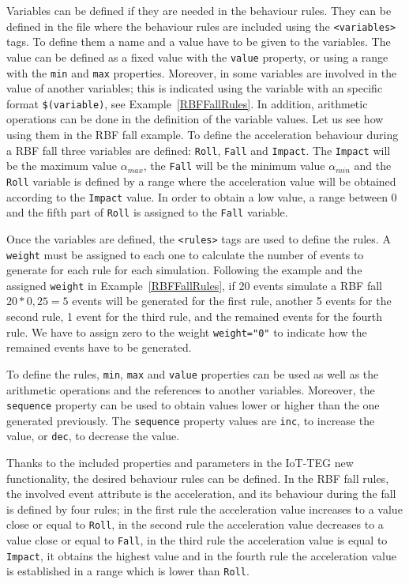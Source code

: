 \documentclass[review]{elsarticle}
\begin{document}
Variables can be defined if they are needed in the behaviour rules. They can be defined in the file where
the behaviour rules are included using the \texttt{<variables>} tags. To define them a name and a value 
have to be given to the variables. The value can be defined as a fixed value with the \texttt{value} 
property, or using a range with the \texttt{min} and \texttt{max} properties. Moreover, in some variables
are involved in the value of another variables; this is indicated using the variable with an specific 
format \texttt{\$(variable)}, see Example~\ref{RBFFallRules}. In addition, arithmetic operations can be 
done in the definition of the variable values. Let us see how using them in the RBF fall example. To 
define the acceleration behaviour during a RBF fall three variables are defined: \texttt{Roll}, 
\texttt{Fall} and \texttt{Impact}. The \texttt{Impact} will be the maximum value $\alpha_{max}$, the 
\texttt{Fall} will be the minimum value $\alpha_{min}$ and the \texttt{Roll} variable is defined by a 
range where the acceleration value will be obtained according to the \texttt{Impact} value. In order to
obtain a low value, a range between 0 and the fifth part of \texttt{Roll} is assigned to the \texttt{Fall} 
variable.

Once the variables are defined, the \texttt{<rules>} tags are used to define the rules. A \texttt{weight}
must be assigned to each one to calculate the number of events to generate for each rule for each simulation.
Following the example and the assigned \texttt{weight} in Example~\ref{RBFFallRules}, if 20 events simulate 
a RBF fall $20 * 0,25 = 5$ events will be generated for the first rule, another 5 events for the second rule,
1 event for the third rule, and the remained events for the fourth rule. We have to assign zero to the weight
\texttt{weight="0"} to indicate how the remained events have to be generated.

To define the rules, \texttt{min}, \texttt{max} and \texttt{value} properties can be used as well as the arithmetic 
operations and the references to another variables. Moreover, the \texttt{sequence} property can be used to obtain
values lower or higher than the one generated previously. The \texttt{sequence} property values are \texttt{inc}, 
to increase the value, or \texttt{dec}, to decrease the value.

Thanks to the included properties and parameters in the IoT-TEG new functionality, the desired behaviour rules can
be defined. In the RBF fall rules, the involved event attribute is the acceleration, and its behaviour during the 
fall is defined by four rules; in the first rule the acceleration value increases to a value close or equal to \texttt{Roll},
in the second rule the acceleration value decreases to a value close or equal to \texttt{Fall}, in the third rule the 
acceleration value is equal to \texttt{Impact}, it obtains the highest value and in the fourth rule the acceleration value
is established in a range which is lower than \texttt{Roll}.
\end{document}
